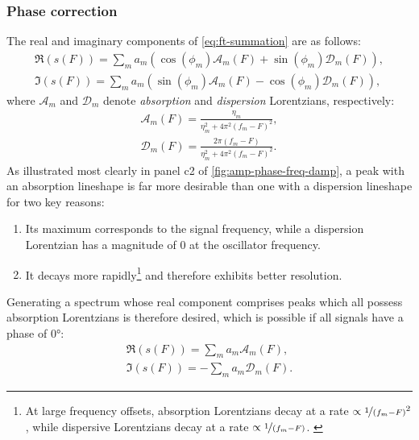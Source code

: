 \subsubsection{Phase correction}
The real and imaginary components of \cref{eq:ft-summation} are as follows:
\begin{subequations}
    \begin{gather}
        \Re(s(F)) = \sum_m
        a_m (\cos(\phi_m) \mathcal{A}_m(F) + \sin(\phi_m) \mathcal{D}_m(F)),\\
        \Im(s(F)) = \sum_m
        a_m (\sin(\phi_m) \mathcal{A}_m(F) - \cos(\phi_m) \mathcal{D}_m(F)),
    \end{gather}
\end{subequations}
where $\mathcal{A}_m$ and  $\mathcal{D}_m$ denote \emph{absorption} and
\emph{dispersion} Lorentzians, respectively:
\begin{subequations}
    \begin{gather}
        \mathcal{A}_m(F) = \frac{\eta_m}{\eta_m^2 + 4 \pi^2 (f_m - F)^2},\\
        \mathcal{D}_m(F) = \frac{2 \pi (f_m - F)}{\eta_m^2 + 4 \pi^2 (f_m - F)^2}.
    \end{gather}
\end{subequations}
As illustrated most clearly in panel c2 of
\cref{fig:amp-phase-freq-damp}, a peak with an absorption lineshape is far more
desirable than one with a dispersion lineshape for two key
reasons:
\begin{enumerate}
    \item Its maximum corresponds to the signal frequency, while a dispersion
        Lorentzian has a magnitude of $0$ at the oscillator frequency.
    \item It decays more rapidly\footnote{
            At large frequency offsets, absorption Lorentzians decay at a rate
            $\propto \nicefrac{1}{(f_m - F)}^2$, while dispersive Lorentzians
            decay at a rate $\propto \nicefrac{1}{(f_m - F)}$.
            \label{fn:lorentzian-decay}
        } and therefore exhibits better resolution.
\end{enumerate}
Generating a spectrum whose real component comprises peaks which all possess
absorption Lorentzians is therefore desired, which is possible if all signals
have a phase of \ang{0}:
\begin{subequations}
    \begin{gather}
        \Re(s(F)) = \sum_m a_m \mathcal{A}_m(F),\label{eq:absorption}\\
        \Im(s(F)) = -\sum_m a_m \mathcal{D}_m(F).\label{eq:dispersion}
    \end{gather}
\end{subequations}
